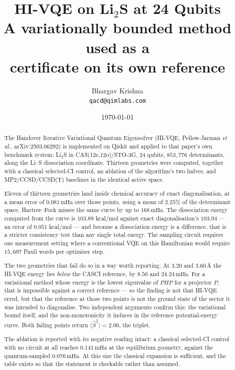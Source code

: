 \documentclass[11pt,a4paper]{article}
\title{\vspace{-1.1cm}\textbf{HI-VQE on Li$_2$S at 24 Qubits}\\[0.4em]
\large A variationally bounded method used as a\\
certificate on its own reference}
\author{Bhargav Krishna\\\small\texttt{qacd@qimlabs.com}}
\date{\today}
\newcommand{\mHa}{\ensuremath{\,\mathrm{mHa}}}
\newcommand{\Ang}{\ensuremath{\,\text{\AA}}}
\newcommand{\Ssq}{\ensuremath{\langle \hat{S}^2 \rangle}}
\begin{document}
\maketitle
\thispagestyle{fancy}

\begin{abstract}
\noindent
The Handover Iterative Variational Quantum Eigensolver (HI-VQE, Pellow-Jarman
\emph{et al.}, arXiv:2503.06292) is implemented on Qiskit and applied to that
paper's own benchmark system: Li$_2$S in CAS(12e,12o)/STO-3G, 24 qubits,
$853{,}776$ determinants, along the Li--S dissociation coordinate. Thirteen
geometries were computed, together with a classical selected-CI control, an
ablation of the algorithm's two halves, and MP2/CCSD/CCSD(T) baselines in the
identical active space.

Eleven of thirteen geometries land inside chemical accuracy of exact
diagonalisation, at a mean error of $0.081\mHa$ over those points, using a mean
of $2.25\%$ of the determinant space. Hartree--Fock misses the same curve by up
to $168\mHa$. The dissociation energy computed from the curve is $103.89$
kcal/mol against exact diagonalisation's $103.94$ --- an error of $0.051$
kcal/mol --- and because a dissociation energy is a difference, that is a
stricter consistency test than any single total energy. The sampling circuit
requires one measurement setting where a conventional VQE on this Hamiltonian
would require $15{,}697$ Pauli words per optimiser step.

The two geometries that fail do so in a way worth reporting. At $3.20$ and
$3.60\Ang$ the HI-VQE energy lies \emph{below} the CASCI reference, by $8.50$
and $24.24\mHa$. For a variational method whose energy is the lowest eigenvalue
of $PHP$ for a projector $P$, that is impossible against a correct reference ---
so the finding is not that HI-VQE erred, but that the reference at those two
points is not the ground state of the sector it was intended to diagonalise. Two
independent arguments confirm this: the variational bound itself, and the
non-monotonicity it induces in the reference potential-energy curve. Both
failing points return $\Ssq = 2.00$, the triplet.

The ablation is reported with its negative reading intact: a classical
selected-CI control with no circuit at all reaches $0.141\mHa$ at the
equilibrium geometry, against the quantum-sampled $0.076\mHa$. At this size the
classical expansion is sufficient, and the table exists so that the statement is
checkable rather than assumed.
\end{abstract}
\end{document}
